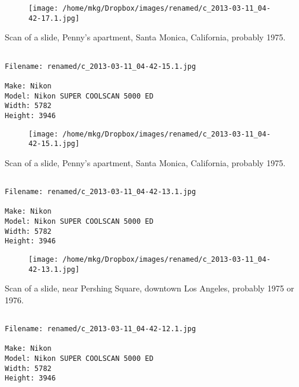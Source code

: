 \begin{figure}
\texttt{[image: /home/mkg/Dropbox/images/renamed/c\_2013-03-11\_04-42-17.1.jpg]}
\end{figure}
    
\clearpage
\onecolumn
\noindent Scan of a slide, Penny's apartment, Santa Monica, California, probably 1975.
\noindent
\begin{lstlisting}

Filename: renamed/c_2013-03-11_04-42-15.1.jpg

Make: Nikon
Model: Nikon SUPER COOLSCAN 5000 ED
Width: 5782
Height: 3946
\end{lstlisting}
\clearpage

\begin{figure}
\texttt{[image: /home/mkg/Dropbox/images/renamed/c\_2013-03-11\_04-42-15.1.jpg]}
\end{figure}
    
\clearpage
\onecolumn
\noindent Scan of a slide, Penny's apartment, Santa Monica, California, probably 1975.
\noindent
\begin{lstlisting}

Filename: renamed/c_2013-03-11_04-42-13.1.jpg

Make: Nikon
Model: Nikon SUPER COOLSCAN 5000 ED
Width: 5782
Height: 3946
\end{lstlisting}
\clearpage

\begin{figure}
\texttt{[image: /home/mkg/Dropbox/images/renamed/c\_2013-03-11\_04-42-13.1.jpg]}
\end{figure}
    
\clearpage
\onecolumn
\noindent Scan of a slide, near Pershing Square, downtown Los Angeles, probably 1975 or 1976.
\noindent
\begin{lstlisting}

Filename: renamed/c_2013-03-11_04-42-12.1.jpg

Make: Nikon
Model: Nikon SUPER COOLSCAN 5000 ED
Width: 5782
Height: 3946
\end{lstlisting}
\clearpage

